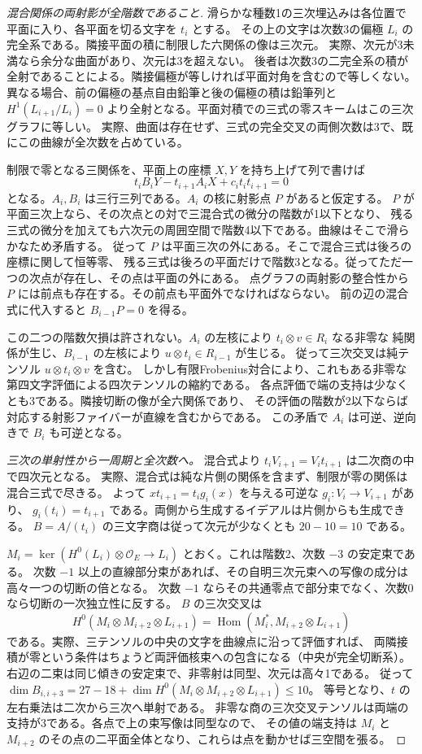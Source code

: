 \begin{proof}[混合関係の両射影が全階数であること]
滑らかな種数1の三次埋込みは各位置で平面に入り、各平面を切る文字を $t_i$ とする。
その上の文字は次数3の偏極 $L_i$ の完全系である。隣接平面の積に制限した六関係の像は三次元。
実際、次元が3未満なら余分な曲面があり、次元は3を超えない。
後者は次数3の二完全系の積が全射であることによる。隣接偏極が等しければ平面対角を含むので等しくない。
異なる場合、前の偏極の基点自由鉛筆と後の偏極の積は鉛筆列と
$H^1(L_{i+1}/L_i)=0$ より全射となる。平面対積での三式の零スキームはこの三次グラフに等しい。
実際、曲面は存在せず、三式の完全交叉の両側次数は3で、既にこの曲線が全次数を占めている。

制限で零となる三関係を、平面上の座標 $X,Y$ を持ち上げて列で書けば
\[
          t_i B_iY-t_{i+1} A_iX+c_i t_it_{i+1}=0
\]
となる。$A_i,B_i$ は三行三列である。$A_i$ の核に射影点 $P$ があると仮定する。
$P$ が平面三次上なら、その次点との対で三混合式の微分の階数が1以下となり、
残る三式の微分を加えても六次元の周囲空間で階数4以下である。曲線はそこで滑らかなため矛盾する。
従って $P$ は平面三次の外にある。そこで混合三式は後ろの座標に関して恒等零、
残る三式は後ろの平面だけで階数3となる。従ってただ一つの次点が存在し、その点は平面の外にある。
点グラフの両射影の整合性から $P$ には前点も存在する。その前点も平面外でなければならない。
前の辺の混合式に代入すると $B_{i-1}P=0$ を得る。

この二つの階数欠損は許されない。$A_i$ の左核により $t_i\otimes v\in R_i$ なる非零な
純関係が生じ、$B_{i-1}$ の左核により $u\otimes t_i\in R_{i-1}$ が生じる。
従って三次交叉は純テンソル $u\otimes t_i\otimes v$ を含む。
しかし有限Frobenius対合により、これもある非零な第四文字評価による四次テンソルの縮約である。
各点評価で端の支持は少なくとも3である。隣接切断の像が全六関係であり、
その評価の階数が2以下ならば対応する射影ファイバーが直線を含むからである。
この矛盾で $A_i$ は可逆、逆向きで $B_i$ も可逆となる。

\smallskip
\noindent\textit{三次の単射性から一周期と全次数へ。}
混合式より $t_i V_{i+1}=V_i t_{i+1}$ は二次商の中で四次元となる。
実際、混合式は純な片側の関係を含まず、制限が零の関係は混合三式で尽きる。
よって $x t_{i+1}=t_i g_i(x)$ を与える可逆な $g_i:V_i\to V_{i+1}$ があり、
$g_i(t_i)=t_{i+1}$ である。両側から生成するイデアルは片側からも生成できる。
$B=A/(t_i)$ の三文字商は従って次元が少なくとも $20-10=10$ である。

$M_i=\ker(H^0(L_i)\otimes\mathcal O_E\to L_i)$ とおく。これは階数2、次数 $-3$ の安定束である。
次数 $-1$ 以上の直線部分束があれば、その自明三次元束への写像の成分は高々一つの切断の倍となる。
次数 $-1$ ならその共通零点で部分束でなく、次数0なら切断の一次独立性に反する。
$B$ の三次交叉は
\[
 H^0(M_i\otimes M_{i+2}\otimes L_{i+1})
 =\operatorname{Hom}(M_i^*,M_{i+2}\otimes L_{i+1})
\]
である。実際、三テンソルの中央の文字を曲線点に沿って評価すれば、
両隣接積が零という条件はちょうど両評価核束への包含になる（中央が完全切断系）。
右辺の二束は同じ傾きの安定束で、非零射は同型、次元は高々1である。
従って $\dim B_{i,i+3}=27-18+\dim H^0(M_i\otimes M_{i+2}\otimes L_{i+1})\le10$。
等号となり、$t$ の左右乗法は二次から三次へ単射である。
非零な商の三次交叉テンソルは両端の支持が3である。各点で上の束写像は同型なので、
その値の端支持は $M_i$ と $M_{i+2}$ のその点の二平面全体となり、これらは点を動かせば三空間を張る。


\end{proof}
